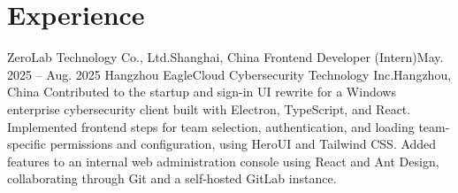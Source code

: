 
\section{Experience}
\resumeSubHeadingListStart
{ZeroLab Technology Co., Ltd.}{Shanghai, China}
\resumeItemListStart
\resumeItem
{
}
\resumeItem
{
}
\resumeItem
{
}
\resumeItem
{
}
\resumeItem
{
}
\resumeItemListEnd
\resumeSubheading
{Frontend Developer (Intern)}{May. 2025 -- Aug. 2025}
{Hangzhou EagleCloud Cybersecurity Technology Inc.}{Hangzhou, China}
\resumeItemListStart
\resumeItem
{
  Contributed to the startup and sign-in UI rewrite for a Windows enterprise cybersecurity client built with Electron, TypeScript, and React. Implemented frontend steps for team selection, authentication, and loading team-specific permissions and configuration, using HeroUI and Tailwind CSS.
}
\resumeItem
{
  Added features to an internal web administration console using React and Ant Design, collaborating through Git and a self-hosted GitLab instance.
}
\resumeItemListEnd
\resumeSubHeadingListEnd
